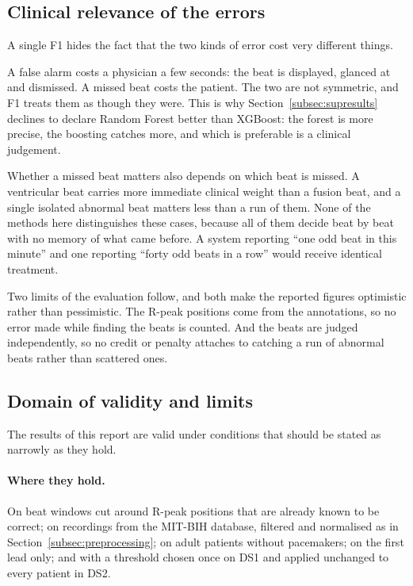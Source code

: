 \documentclass[a4paper, 12pt]{article}
\begin{document}
\subsection{Clinical relevance of the errors} \label{subsec:clinical}

A single F1 hides the fact that the two kinds of error cost very different things.

A false alarm costs a physician a few seconds: the beat is displayed, glanced at
and dismissed. A missed beat costs the patient. The two are not symmetric, and F1
treats them as though they were. This is why Section~\ref{subsec:supresults}
declines to declare Random Forest better than XGBoost: the forest is more precise,
the boosting catches more, and which is preferable is a clinical judgement.

Whether a missed beat matters also depends on which beat is missed. A ventricular
beat carries more immediate clinical weight than a fusion beat, and a single
isolated abnormal beat matters less than a run of them. None of the methods here
distinguishes these cases, because all of them decide beat by beat with no memory
of what came before. A system reporting ``one odd beat in this minute'' and one
reporting ``forty odd beats in a row'' would receive identical treatment.

Two limits of the evaluation follow, and both make the reported figures optimistic
rather than pessimistic. The R-peak positions come from the annotations, so no
error made while finding the beats is counted. And the beats are judged
independently, so no credit or penalty attaches to catching a run of abnormal beats
rather than scattered ones.

\subsection{Domain of validity and limits} \label{subsec:validity}

The results of this report are valid under conditions that should be stated as
narrowly as they hold.

\paragraph{Where they hold.} On beat windows cut around R-peak positions that are
already known to be correct; on recordings from the MIT-BIH database, filtered and
normalised as in Section~\ref{subsec:preprocessing}; on adult patients without
pacemakers; on the first lead only; and with a threshold chosen once on DS1 and
applied unchanged to every patient in DS2.
\end{document}
